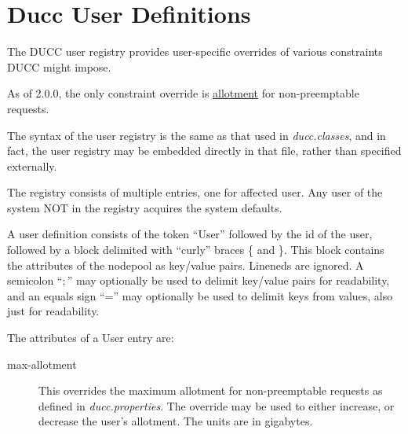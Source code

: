 % 
% 
% 
% 
\section{Ducc User Definitions}
\label{sec:admin-ducc.users}
    The DUCC user registry provides user-specific overrides of various constraints
    DUCC might impose.  

    As of 2.0.0, the only constraint override is 
    \hyperref[sec:rm.allotment]{allotment} for non-preemptable requests.

    The syntax of the user registry is the same as that used in
    {\em ducc.classes}, and in fact, the user registry may be embedded directly
    in that file, rather than specified externally.

    The registry consists of multiple entries, one for affected user.  Any user
    of the system NOT in the registry acquires the system defaults.

    A user definition consists of the token ``User'' followed by the 
    id of the user, followed by a block delimited with ``curly'' braces \{ and \}.  This
    block contains the attributes of the nodepool as key/value pairs.
    Lineneds are ignored.  A semicolon ``$;$'' may optionally be used to
    delimit key/value pairs for readability, and an equals sign ``='' may optionally
    be used to delimit keys from values, also just for readability.  

    The attributes of a User entry are:
    \begin{description}
      \item[max-allotment] This overrides the maximum allotment for non-preemptable
        requests as defined in {\em ducc.properties}.  The override may be used to
        either increase, or decrease the user's allotment.  The units are in gigabytes.
    \end{description}

